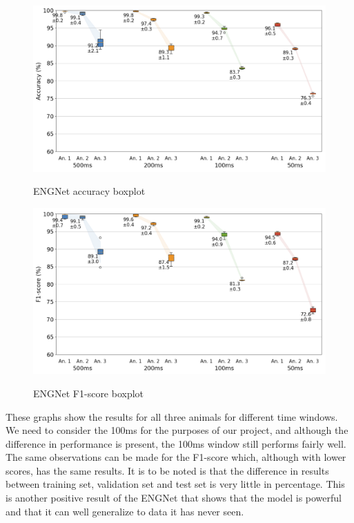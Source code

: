 \documentclass{Configuration_Files/PoliMi3i_thesis}
\begin{document}
\begin{figure}[H]
	\includegraphics[scale=0.5]{engNet_accuracy.png}
	\centering
    \label{engNet_params_5}
    \caption{ENGNet accuracy boxplot \cite{tesiDavide}}
	\end{figure}
	
	\begin{figure}[H]
		\includegraphics[scale=0.5]{engNet_f1score.png}
		\centering
        \label{engNet_params_6}
        \caption{ENGNet F1-score boxplot \cite{tesiDavide}}
		\end{figure}

These graphs show the results for all three animals for different time windows.
We need to consider the 100ms for the purposes of our project, and although the difference in performance is present, the 100ms window still performs fairly well.
The same observations can be made for the F1-score which, although with lower scores, has the same results.
It is to be noted is that the difference in results between training set, validation set and test set is very little in percentage.
This is another positive result of the ENGNet that shows that the model is powerful and that it can well generalize to data it has never seen.
\end{document}
